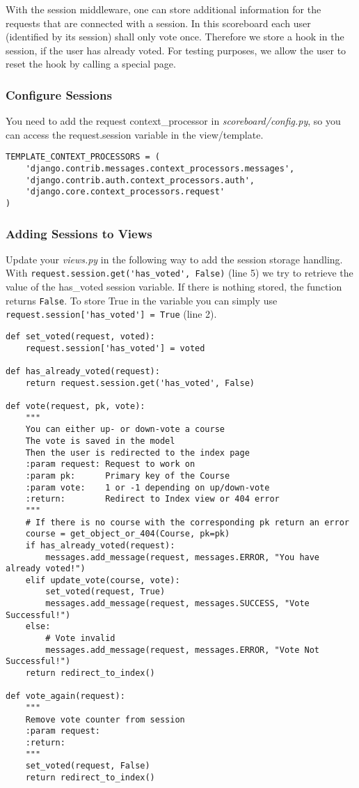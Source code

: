 With the session middleware, one can store additional information for the requests that are connected with a session. In this scoreboard each user (identified by its session) shall only vote once. Therefore we store a hook in the session, if the user has already voted. For testing purposes, we allow the user to reset the hook by calling a special page.

\subsubsection{Configure Sessions}
You need to add the request context\_processor in \emph{scoreboard/config.py}, so you can access the request.session variable in the view/template.
\begin{lstlisting}[style=Python, caption=webtech/config.py, label=lst:config.py1]
TEMPLATE_CONTEXT_PROCESSORS = (
    'django.contrib.messages.context_processors.messages',
    'django.contrib.auth.context_processors.auth',
    'django.core.context_processors.request'
)
\end{lstlisting}

\subsubsection{Adding Sessions to Views}
Update your \emph{views.py} in the following way to add the session storage handling. With \lstinline|request.session.get('has_voted', False)| (line 5) we try to retrieve the value of the has\_voted session variable. If there is nothing stored, the function returns \lstinline|False|. To store True in the variable you can simply use \lstinline|request.session['has_voted'] = True| (line 2).
\begin{lstlisting}[style=Python, caption=Session handling in vote view, label=lst:views_session]
def set_voted(request, voted):
    request.session['has_voted'] = voted

def has_already_voted(request):
    return request.session.get('has_voted', False)

def vote(request, pk, vote):
    """
    You can either up- or down-vote a course
    The vote is saved in the model
    Then the user is redirected to the index page
    :param request: Request to work on
    :param pk:      Primary key of the Course
    :param vote:    1 or -1 depending on up/down-vote
    :return:        Redirect to Index view or 404 error
    """
    # If there is no course with the corresponding pk return an error
    course = get_object_or_404(Course, pk=pk)
    if has_already_voted(request):
        messages.add_message(request, messages.ERROR, "You have already voted!")
    elif update_vote(course, vote):
        set_voted(request, True)
        messages.add_message(request, messages.SUCCESS, "Vote Successful!")
    else:
        # Vote invalid
        messages.add_message(request, messages.ERROR, "Vote Not Successful!")
    return redirect_to_index()
    
def vote_again(request):
    """
    Remove vote counter from session
    :param request:
    :return:
    """
    set_voted(request, False)
    return redirect_to_index()
\end{lstlisting}

